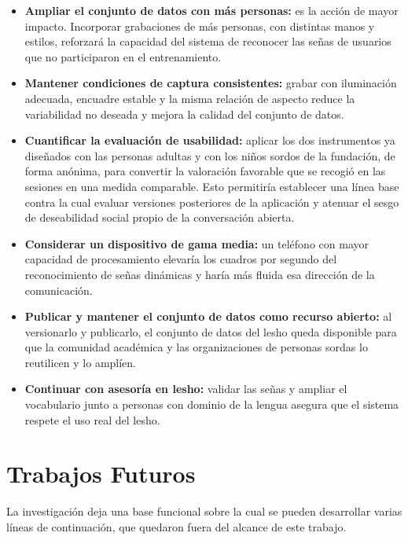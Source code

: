 \begin{itemize}
    \item \textbf{Ampliar el conjunto de datos con más personas:} es la acción de mayor impacto. Incorporar grabaciones de más personas, con distintas manos y estilos, reforzará la capacidad del sistema de reconocer las señas de usuarios que no participaron en el entrenamiento.
    \item \textbf{Mantener condiciones de captura consistentes:} grabar con iluminación adecuada, encuadre estable y la misma relación de aspecto reduce la variabilidad no deseada y mejora la calidad del conjunto de datos.
    \item \textbf{Cuantificar la evaluación de usabilidad:} aplicar los dos instrumentos ya diseñados con las personas adultas y con los niños sordos de la fundación, de forma anónima, para convertir la valoración favorable que se recogió en las sesiones en una medida comparable. Esto permitiría establecer una línea base contra la cual evaluar versiones posteriores de la aplicación y atenuar el sesgo de deseabilidad social propio de la conversación abierta.
    \item \textbf{Considerar un dispositivo de gama media:} un teléfono con mayor capacidad de procesamiento elevaría los cuadros por segundo del reconocimiento de señas dinámicas y haría más fluida esa dirección de la comunicación.
    \item \textbf{Publicar y mantener el conjunto de datos como recurso abierto:} al versionarlo y publicarlo, el conjunto de datos del \Acrshort{lesho} queda disponible para que la comunidad académica y las organizaciones de personas sordas lo reutilicen y lo amplíen.
    \item \textbf{Continuar con asesoría en \Acrshort{lesho}:} validar las señas y ampliar el vocabulario junto a personas con dominio de la lengua asegura que el sistema respete el uso real del \Acrshort{lesho}.
\end{itemize}

\section{Trabajos Futuros}

La investigación deja una base funcional sobre la cual se pueden desarrollar varias líneas de continuación, que quedaron fuera del alcance de este trabajo.

